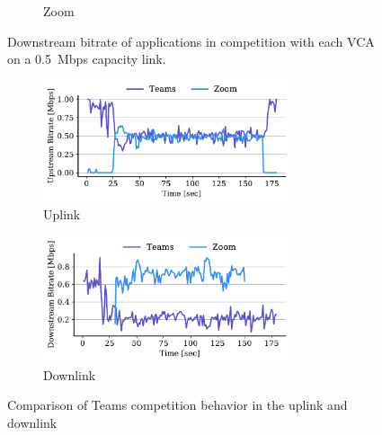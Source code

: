 \begin{figure}[t!]
\begin{subfigure}[t]{.33\textwidth}
    \caption{Zoom}
    \label{fig:zoom-dl-boxplot-0.5}
\end{subfigure}
\caption{Downstream bitrate of applications in competition with each VCA on a 0.5~Mbps capacity link.}
\label{fig:dnld-boxplot}
\end{figure}

\begin{figure}[t!]
\centering
\begin{subfigure}[t]{.5\textwidth}
    \centering
    \includegraphics[width=0.8\textwidth]{figures/comp_ts/teams_zoom_1_ul_r2.pdf}
    \caption{Uplink}
    \label{fig:teams-zoom-up-1}
\end{subfigure}\hfill
\begin{subfigure}[t]{.5\textwidth}
    \centering
    \includegraphics[width=0.8\textwidth]{figures/comp_ts/teams_zoom_1_dl_r2.pdf}
    \caption{Downlink}
    \label{fig:teams-zoom-down-1}
\end{subfigure}
\caption{Comparison of Teams competition behavior in the uplink and downlink}
\label{fig:teams-zoom-1}
\end{figure}


